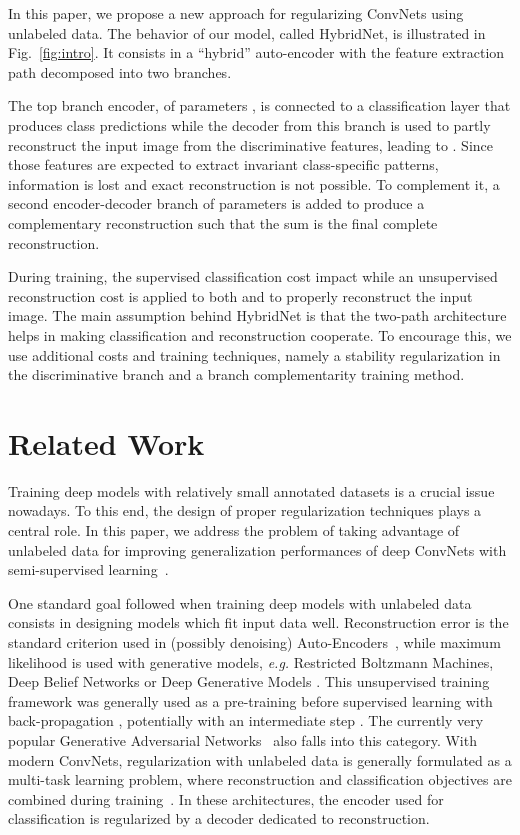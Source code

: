 \documentclass[runningheads]{llncs}
\begin{document}
In this paper, we propose a new approach for regularizing ConvNets using unlabeled data. The behavior of our model, called HybridNet, is illustrated in Fig.~\ref{fig:intro}. It consists in a ``hybrid'' auto-encoder with the feature extraction path decomposed into two branches.

The top branch encoder, of parameters , is connected to a classification layer that produces class predictions
while the decoder from this branch is used to partly reconstruct the input image from the discriminative features, leading to . Since those features are expected to extract invariant class-specific patterns, information is lost and exact reconstruction is not possible. To complement it, a second encoder-decoder branch of parameters  is added to produce a complementary reconstruction  such that the sum  is the final complete reconstruction.

During training, the supervised classification cost impact  while an unsupervised reconstruction cost is applied to both  and  to properly reconstruct the input image. The main assumption behind HybridNet is that the two-path architecture helps in making classification and reconstruction cooperate. To encourage this, we use additional costs and training techniques, namely a stability regularization in the discriminative branch and a branch complementarity training method.



\section{Related Work}

Training deep models with relatively small annotated datasets is a crucial issue nowadays.
To this end, the design of proper regularization techniques plays a central role.
In this paper, we address the problem of taking advantage of unlabeled data for improving generalization performances of deep ConvNets with semi-supervised learning~\cite{Zhu2005}.

One standard goal followed when training deep models with unlabeled data consists in designing models which fit input data well. Reconstruction error is the standard criterion used in (possibly denoising) Auto-Encoders~\cite{bengio2007greedy,Ranzato2008,Ranzato2007b,vincent2008extracting}, while maximum likelihood is used with generative models, \textit{e.g.} Restricted Boltzmann Machines, Deep Belief Networks or Deep Generative Models \cite{hinton2006reducing,Ranzato2007,Larochelle2008,kingma2014semi}. This unsupervised training framework was generally used as a pre-training before supervised learning with back-propagation \cite{erhan2010does}, potentially with an intermediate step \cite{Goh_NIPS13}. The currently very popular Generative Adversarial Networks~\cite{NIPS2014_5423} also falls into this category. With modern ConvNets, regularization with unlabeled data is generally formulated as a multi-task learning problem, where reconstruction and classification objectives are combined during training~\cite{Zhao2016a,Zhang2016a,Makhzani2016}. In these architectures, the encoder used for classification is regularized by a decoder dedicated to reconstruction.
\end{document}
